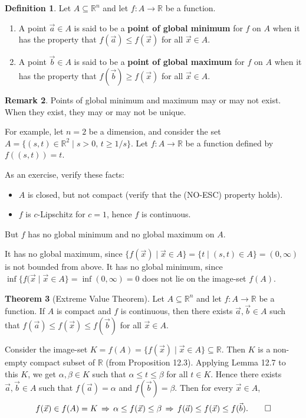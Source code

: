\documentclass[11pt]{article}
\makeatletter
\theoremstyle{definition}
\newtheorem{thm}{Theorem}[section]
\newtheorem{defn}[thm]{Definition}
\newtheorem{remark}[thm]{Remark}
\newcommand{\R}{\ensuremath{\mathbb{R}}}
\newenvironment{pf}[1][\proofname]{\par
  \pushQED{\qed}%
  \normalfont \topsep0\p@\relax
  \trivlist
  \item[\hskip\labelsep\itshape
  #1\@addpunct{.}]\ignorespaces
}{%
  \popQED\endtrivlist\@endpefalse
}
\makeatother
\begin{document}
\begin{defn}
Let $A \subseteq \R^n$ and let $f : A \to \R$ be a function. \vspace{-1.5ex}
\begin{enumerate}[(1)]
\item A point $\vec{a} \in A$ is said to be a {\bf point of global minimum} for $f$ on $A$ when it has the property that $f(\vec{a}) \leq f(\vec{x})$ for all $\vec{x} \in A$. 
\item A point $\vec{b} \in A$ is said to be a {\bf point of global maximum} for $f$ on $A$ when it has the property that $f(\vec{b}) \geq f(\vec{x})$ for all $\vec{x} \in A$. 
\end{enumerate}
\end{defn}

\begin{remark}
Points of global minimum and maximum may or may not exist. When they exist, they may or may not be unique.

For example, let $n = 2$ be a dimension, and consider the set $A = \{(s, t) \in \R^2 \mid s > 0,\, t \geq 1/s\}$. Let $f : A \to \R$ be a function defined by $f\left((s, t)\right) = t$. 

As an exercise, verify these facts:\vspace{-1.5ex}
\begin{itemize}
    \item $A$ is closed, but not compact (verify that the (NO-ESC) property holds).
    \item $f$ is $c$-Lipschitz for $c = 1$, hence $f$ is continuous.
\end{itemize}
\vspace{-1.5ex}
But $f$ has no global minimum and no global maximum on $A$.

It has no global maximum, since $\{f(\vec{x}) \mid \vec{x} \in A\} = \{t \mid (s, t) \in A\} = (0, \infty)$ is not bounded from above. It has no global minimum, since $\inf\{f(\vec{x} \mid \vec{x} \in A\} = \inf(0, \infty) = 0$ does not lie on the image-set $f(A)$. 
\end{remark}

\begin{thm}[Extreme Value Theorem]
Let $A \subseteq \R^n$ and let $f : A \to \R$ be a function. If $A$ is compact and $f$ is continuous, then there exists $\vec{a}, \vec{b} \in A$ such that $f(\vec{a}) \leq f(\vec{x}) \leq f(\vec{b})$ for all $\vec{x} \in A$. 
\end{thm}
\begin{pf}
Consider the image-set $K = f(A) = \{f(\vec{x}) \mid \vec{x} \in A\} \subseteq \R$. Then $K$ is a non-empty compact subset of $\R$ (from Proposition 12.3). Applying Lemma 12.7 to this $K$, we get $\alpha, \beta \in K$ such that $\alpha \leq t \leq \beta$ for all $t \in K$. Hence there exists $\vec{a}, \vec{b} \in A$ such that $f(\vec{a}) = \alpha$ and $f(\vec{b}) = \beta$. Then for every $\vec{x} \in A$, 
\[ f(\vec{x}) \in f(A) = K \, \Rightarrow \, \alpha \leq f(\vec{x}) \leq \beta \, \Rightarrow \, f(\vec{a}) \leq f(\vec{x}) \leq f(\vec{b}). \qedhere \]
\end{pf}
\end{document}
